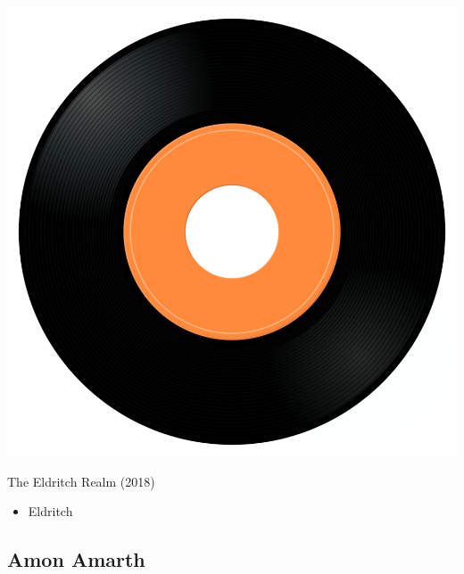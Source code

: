 \begin{minipage}[t]{0.25\textwidth}\vspace{0pt}
\captionsetup{type=figure}
\includegraphics[width=\textwidth]{Images/cover.png}
\caption*{The Eldritch Realm (2018)}
\end{minipage}
\begin{minipage}[t]{0.25\textwidth}\vspace{0pt}
\begin{itemize}[nosep,leftmargin=1em,labelwidth=*,align=left]
	\setlength{\itemsep}{0pt}
	\item Eldritch
\end{itemize}
\end{minipage}

\subsection{Amon Amarth}

